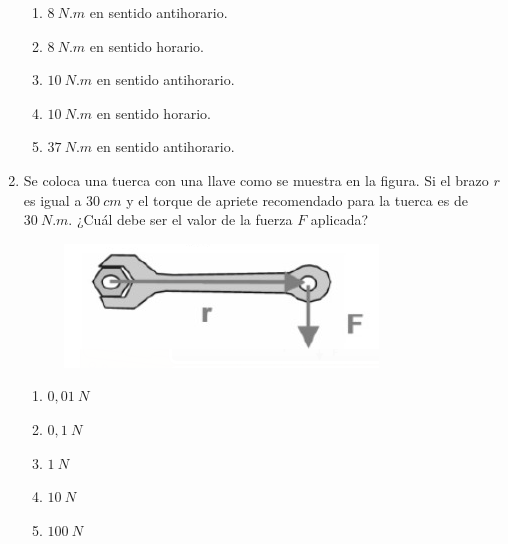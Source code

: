 \documentclass[letterpaper]{article}
\newenvironment{enumalf}
{\begin{enumerate}[label=\Alph*)]}
{\end{enumerate}}
\begin{document}
\begin{enumerate}
\begin{figure}[h]
\centering
{}

\end{figure}

\begin{enumalf}
\item $8\ \si{N.m}$ en sentido antihorario.
\item $8\ \si{N.m}$ en sentido horario.
\item $10\ \si{N.m}$ en sentido antihorario.
\item $10\ \si{N.m}$ en sentido horario.
\item $37\ \si{N.m}$ en sentido antihorario.
\end{enumalf}

\item Se coloca una tuerca con una llave como se muestra en la figura. Si el brazo $r$ es igual a $30\ \si{cm}$ y el torque de apriete recomendado para la tuerca es de $30\ \si{N.m}$. ¿Cuál debe ser el valor de la fuerza $F$ aplicada?

\begin{figure}[h]
\centering
\includegraphics[scale=0.5]{tuerca.png}
\end{figure}

\begin{enumalf}
\item $0,01\ \si{N}$
\item $0,1\ \si{N}$
\item $1\ \si{N}$
\item $10\ \si{N}$
\item $100\ \si{N}$
\end{enumalf}


\end{enumerate}
\end{document}
